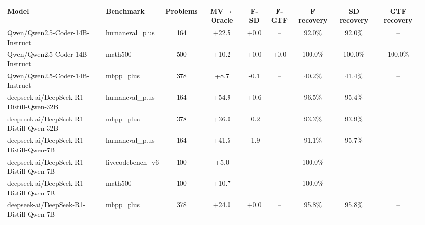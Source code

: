 \begin{tabular}{llccccccc}
\toprule
Model & Benchmark & Problems & MV$\rightarrow$Oracle & F-SD & F-GTF & F recovery & SD recovery & GTF recovery \\
\midrule
Qwen/Qwen2.5-Coder-14B-Instruct & humaneval_plus & 164 & +22.5 & +0.0 & -- & 92.0\% & 92.0\% & -- \\
Qwen/Qwen2.5-Coder-14B-Instruct & math500 & 500 & +10.2 & +0.0 & +0.0 & 100.0\% & 100.0\% & 100.0\% \\
Qwen/Qwen2.5-Coder-14B-Instruct & mbpp_plus & 378 & +8.7 & -0.1 & -- & 40.2\% & 41.4\% & -- \\
deepseek-ai/DeepSeek-R1-Distill-Qwen-32B & humaneval_plus & 164 & +54.9 & +0.6 & -- & 96.5\% & 95.4\% & -- \\
deepseek-ai/DeepSeek-R1-Distill-Qwen-32B & mbpp_plus & 378 & +36.0 & -0.2 & -- & 93.3\% & 93.9\% & -- \\
deepseek-ai/DeepSeek-R1-Distill-Qwen-7B & humaneval_plus & 164 & +41.5 & -1.9 & -- & 91.1\% & 95.7\% & -- \\
deepseek-ai/DeepSeek-R1-Distill-Qwen-7B & livecodebench_v6 & 100 & +5.0 & -- & -- & 100.0\% & -- & -- \\
deepseek-ai/DeepSeek-R1-Distill-Qwen-7B & math500 & 100 & +10.7 & -- & -- & 100.0\% & -- & -- \\
deepseek-ai/DeepSeek-R1-Distill-Qwen-7B & mbpp_plus & 378 & +24.0 & +0.0 & -- & 95.8\% & 95.8\% & -- \\
\bottomrule
\end{tabular}
